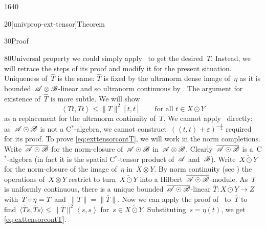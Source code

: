 \begin{parsec}{1640}
\begin{point}{20}[univprop-ext-tensor]{Theorem}
\begin{point}{30}{Proof}
\begin{point}{80}{Universal property}
    we could simply apply~
    to get the desired~$\hat{T}$.
Instead, we will retrace the steps of its proof
    and modify it for the present situation.
Uniqueness of~$\hat{T}$ is the same:
    $\hat{T}$ is fixed by the ultranorm dense image of~$\eta$
    as it is bounded~$\mathscr{A}\otimes\mathscr{B}$-linear
    and so ultranorm continuous by .
The argument for existence of~$\hat{T}$ is more subtle.
We will show
\begin{equation}\label{eq:exttensorcontT}
    \left<T t, T t\right> \leq \|T\|^2 [t,t]
        \qquad \text{for all~$t \in X \odot Y$}
\end{equation}
as a replacement for the ultranorm continuity of~$T$.
We cannot apply~ directly:
    as~$\mathscr{A} \odot \mathscr{B}$ is not a C$^*$-algebra,
    we cannot construct~$(\left<t,t\right>+\varepsilon)^{-\frac{1}{2}}$
    required for its proof.
To prove \eqref{eq:exttensorcontT}, we will work in the norm completions.
Write~$\overline{\mathscr{A} \odot \mathscr{B}}$
    for the norm-closure of~$\mathscr{A} \odot \mathscr{B}$ in~$\mathscr{A} \otimes \mathscr{B}$.
Clearly~$\overline{\mathscr{A} \odot \mathscr{B}}$
    is a~C$^*$-algebra
    (in fact it is the spatial C$^*$-tensor product of~$\mathscr{A}$ and~$\mathscr{B}$).
Write~$\overline{X \odot Y}$
    for the norm-closure of the image of~$\eta$ in~$X \otimes Y$.
By norm continuity
    (see )
    the operations of~$X \otimes Y$
    restrict to turn~$\overline{X \odot Y}$ into a
    Hilbert~$\overline{\mathscr{A} \odot \mathscr{B}}$-module.
As~$T$ is uniformly continuous,
    there is a unique bounded~$\overline{\mathscr{A}\odot\mathscr{B}}$-linear
    $\overline{T}\colon \overline{X\odot Y} \to Z$
    with~$\overline{T} \mathop{\circ} \eta = T$ and~$\|T\| = \|\overline{T}\|$.
Now we can apply the proof of~
    to~$\overline{T}$
    to find~$\langle \overline{T}s,\overline{T}s\rangle \leq
    \|\overline{T}\|^2\left<s,s\right>$
    for~$s \in \overline{X \odot Y}$.
Substituting~$s = \eta(t)$,
    we get \eqref{eq:exttensorcontT}.


\end{point}
\end{point}
\end{point}
\end{parsec}
